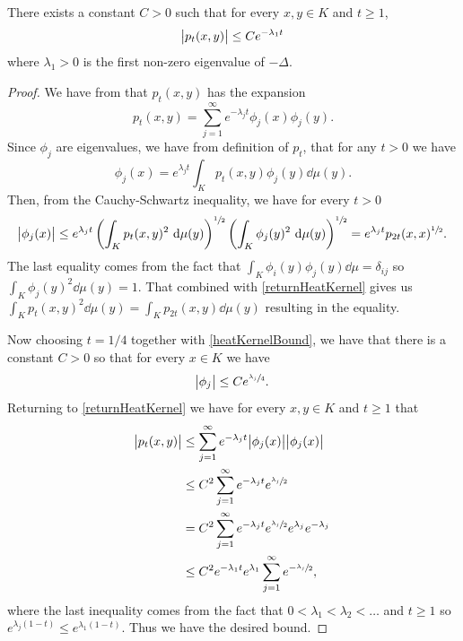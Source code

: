 \medskip
\begin{lemma}\label{heatKernelBound2}
	There exists a constant $C> 0$ such that for every $x,y \in K$ and $t \geq 1$,
	\begin{equation}
		\abs{p_t(x,y)} \leq Ce^{-\lambda_1 t}
	\end{equation}
	where $\lambda_1 > 0$ is the first non-zero eigenvalue of $-\Delta$.
\end{lemma}
\begin{proof}
	We have from  that $p_t(x,y)$ has the expansion
	\begin{equation}\label{returnHeatKernel}
		p_t(x,y) = \sum_{j = 1}^{\infty} e^{-\lambda_j t}\phi_j(x)\phi_j(y).
	\end{equation}
	Since $\phi_j$ are eigenvalues, we have from definition of $p_t$, that for any $t > 0$ we have
	\begin{equation}
		\phi_j(x) = e^{\lambda_jt}\int_{K}p_t(x,y)\phi_j(y) \dd \mu (y).
	\end{equation}
	Then, from the Cauchy-Schwartz inequality, we have for every $t > 0$ 
	\begin{equation}
		\abs{\phi_j(x)} \leq e^{\lambda_j t} \left(\int_{K} p_t(x,y)^{2} \ \text{d} \mu (y)\right)^{\sfrac{1}{2}}\left(\int_{K} \phi_j(y)^{2} \ \text{d} \mu (y)\right)^{\sfrac{1}{2}}  = e^{\lambda_j t}p_{2t}(x,x)^{\sfrac{1}{2}}.
	\end{equation}
	The last equality comes from the fact that $\int_{K}\phi_i(y)\phi_j(y) \dd \mu = \delta_{ij}$ so $\int_{K} \phi_j(y)^{2} \dd \mu (y) = 1$. That combined with \eqref{returnHeatKernel} gives us $\int_{K} p_t(x,y)^{2} \dd \mu (y) = \int_{K} p_{2t}(x,y) \dd \mu (y)$ resulting in the equality.
	
	Now choosing $t = 1/4$ together with \eqref{heatKernelBound}, we have that there is a constant $C > 0$ so that for every $x \in K$ we have
	\begin{equation}
		\abs{\phi_j} \leq C e^{\sfrac{\lambda_j}{4}}.
	\end{equation}
	Returning to \eqref{returnHeatKernel} we have for every $x, y \in K$ and $t \geq 1$ that
	\begin{align}
		\abs{p_t(x,y)} &\leq \sum_{j = 1}^{\infty} e^{-\lambda_jt} \abs{\phi_j(x)} \abs{\phi_j(x)} \\
		& \leq C^2 \sum_{j = 1}^{\infty} e^{-\lambda_jt} e^{\sfrac{\lambda_j}{2}} \\
		& = C^2 \sum_{j = 1}^{\infty} e^{-\lambda_jt} e^{\sfrac{\lambda_j}{2}} e^{\lambda_j}e^{-\lambda_j} \\
		&\leq C^2 e^{-\lambda_1 t}e^{\lambda_1}\sum_{j = 1}^{\infty} e^{-\sfrac{\lambda_j}{2}},
	\end{align}
	where the last inequality comes from the fact that $0 < \lambda_1 < \lambda_2 < \ldots$ and $t \geq 1$ so \\ $e^{\lambda_j(1-t)} \leq e^{\lambda_1(1-t)}$. Thus we have the desired bound.
\end{proof}

